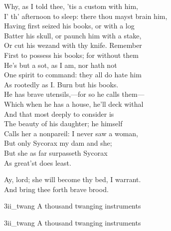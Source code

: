 \begin{verse_speech}[Caliban] 
Why, as I told thee, 'tis a custom with him,\\
I' th' afternoon to sleep: there thou mayst brain him,\\
Having first seized his books, or with a log\\
Batter his skull, or paunch him with a stake,\\
Or cut his wezand with thy knife. Remember\\
First to possess his books; for without them\\
He's but a sot, as I am, nor hath not\\
One spirit to command: they all do hate him\\
As rootedly as I. Burn but his books.\\
He has brave utensils,—for so he calls them—\\
Which when he has a house, he'll deck withal\\
And that most deeply to consider is\\
The beauty of his daughter; he himself\\
Calls her a nonpareil: I never saw a woman,\\
But only Sycorax my dam and she;\\
But she as far surpasseth Sycorax\\
As great'st does least.
\end{verse_speech}


\begin{verse_speech}[Caliban] 
Ay, lord; she will become thy bed, I warrant.\\
And bring thee forth brave brood.
\end{verse_speech}



\begin{pictures} %
	\begin{letter}
			\begin{colorbigpic}
			[1.1]
			{3ii_twang}
			{A thousand twanging instruments}
		\end{colorbigpic}		
	\end{letter}
	\begin{a4}
			\begin{colorbigpic}
			[1]
			{3ii_twang}
			{A thousand twanging instruments}
		\end{colorbigpic}		
	\end{a4}
\end{pictures}


